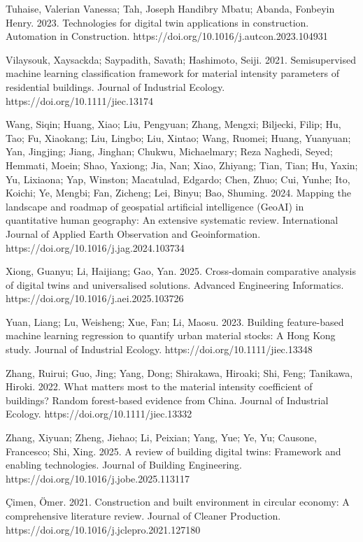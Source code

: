 Tuhaise, Valerian Vanessa; Tah, Joseph Handibry Mbatu; Abanda, Fonbeyin Henry. 2023. Technologies for digital twin applications in construction. Automation in Construction. https://doi.org/10.1016/j.autcon.2023.104931

Vilaysouk, Xaysackda; Saypadith, Savath; Hashimoto, Seiji. 2021. Semisupervised machine learning classification framework for material intensity parameters of residential buildings. Journal of Industrial Ecology. https://doi.org/10.1111/jiec.13174

Wang, Siqin; Huang, Xiao; Liu, Pengyuan; Zhang, Mengxi; Biljecki, Filip; Hu, Tao; Fu, Xiaokang; Liu, Lingbo; Liu, Xintao; Wang, Ruomei; Huang, Yuanyuan; Yan, Jingjing; Jiang, Jinghan; Chukwu, Michaelmary; Reza Naghedi, Seyed; Hemmati, Moein; Shao, Yaxiong; Jia, Nan; Xiao, Zhiyang; Tian, Tian; Hu, Yaxin; Yu, Lixiaona; Yap, Winston; Macatulad, Edgardo; Chen, Zhuo; Cui, Yunhe; Ito, Koichi; Ye, Mengbi; Fan, Zicheng; Lei, Binyu; Bao, Shuming. 2024. Mapping the landscape and roadmap of geospatial artificial intelligence (GeoAI) in quantitative human geography: An extensive systematic review. International Journal of Applied Earth Observation and Geoinformation. https://doi.org/10.1016/j.jag.2024.103734

Xiong, Guanyu; Li, Haijiang; Gao, Yan. 2025. Cross-domain comparative analysis of digital twins and universalised solutions. Advanced Engineering Informatics. https://doi.org/10.1016/j.aei.2025.103726

Yuan, Liang; Lu, Weisheng; Xue, Fan; Li, Maosu. 2023. Building feature-based machine learning regression to quantify urban material stocks: A Hong Kong study. Journal of Industrial Ecology. https://doi.org/10.1111/jiec.13348

Zhang, Ruirui; Guo, Jing; Yang, Dong; Shirakawa, Hiroaki; Shi, Feng; Tanikawa, Hiroki. 2022. What matters most to the material intensity coefficient of buildings? Random forest-based evidence from China. Journal of Industrial Ecology. https://doi.org/10.1111/jiec.13332

Zhang, Xiyuan; Zheng, Jiehao; Li, Peixian; Yang, Yue; Ye, Yu; Causone, Francesco; Shi, Xing. 2025. A review of building digital twins: Framework and enabling technologies. Journal of Building Engineering. https://doi.org/10.1016/j.jobe.2025.113117

Çimen, Ömer. 2021. Construction and built environment in circular economy: A comprehensive literature review. Journal of Cleaner Production. https://doi.org/10.1016/j.jclepro.2021.127180

